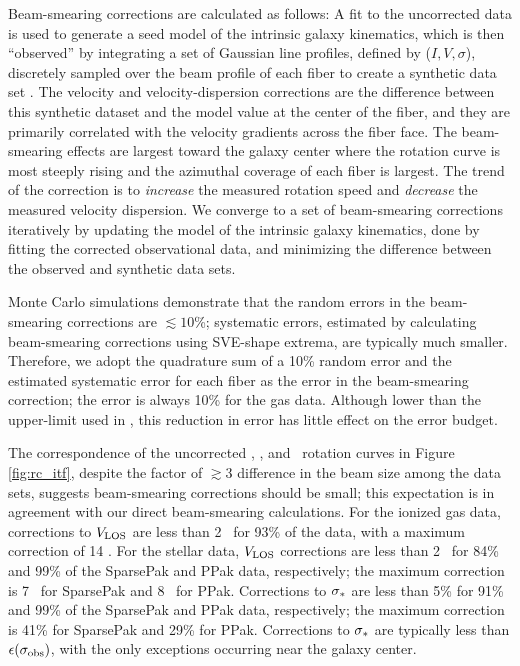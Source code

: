 \documentclass[apj,iop,numberedappendix]{emulateapj}
\begin{document}
Beam-smearing corrections are calculated as follows:  A fit to the uncorrected
data is used to generate a seed model of the intrinsic galaxy kinematics, which
is then ``observed'' by integrating a set of Gaussian line profiles, defined by
($I,V,\sigma$), discretely sampled over the beam profile of each fiber to create
a synthetic data set \citep{KBWPhD}.  The velocity and velocity-dispersion
corrections are the difference between this synthetic dataset and the model
value at the center of the fiber, and they are primarily correlated
with the velocity gradients across the fiber face.  The beam-smearing effects are
largest toward the galaxy center where the rotation curve is most steeply rising
and the azimuthal coverage of each fiber is largest.  The trend of the
correction is to {\it increase} the measured rotation speed and {\it decrease}
the measured velocity dispersion.  We converge to a set of beam-smearing
corrections iteratively by updating the model of the intrinsic galaxy
kinematics, done by fitting the corrected observational data, and minimizing the
difference between the observed and synthetic data sets.

Monte Carlo simulations demonstrate that the random errors in the beam-smearing
corrections are $\lesssim 10$\%; systematic errors, estimated by calculating
beam-smearing corrections using SVE-shape extrema, are typically much smaller.
Therefore, we adopt the quadrature sum of a 10\% random error and the estimated
systematic error for each fiber as the error in the beam-smearing correction;
the error is always 10\% for the gas data.  Although lower than the upper-limit
used in , this reduction in error has little
effect on the error budget.

The correspondence of the uncorrected \halp, \oiii, and \hone\ rotation curves
in Figure \ref{fig:rc_itf}, despite the factor of $\gtrsim3$ difference in the
beam size among the data sets, suggests beam-smearing corrections should be
small; this expectation is in agreement with our direct beam-smearing
calculations.  For the ionized gas data, corrections to $V_{\rm LOS}$ are less than 2
\kms\ for 93\% of the data, with a maximum correction of 14 \kms.  For the
stellar data, $V_{\rm LOS}$ corrections are less than 2 \kms\ for 84\% and 99\% of the
SparsePak and PPak data, respectively; the maximum correction is 7 \kms\ for
SparsePak and 8 \kms\ for PPak.  Corrections to $\sigma_{\ast}$ are less than 5\% for
91\% and 99\% of the SparsePak and PPak data, respectively; the maximum
correction is 41\% for SparsePak and 29\% for PPak.  Corrections to $\sigma_{\ast}$ are
typically less than $\epsilon(\sigma_{\rm obs})$, with the only exceptions occurring near
the galaxy center.
\end{document}
